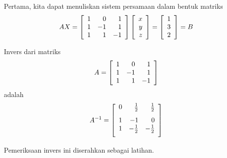 \begin{solution} Pertama, kita dapat menuliskan sistem persamaan dalam bentuk matriks
\begin{equation}
AX = 
\left[
\begin{array}{rrr}
1 & 0 & 1 \\
1 & -1 & 1 \\
1 & 1 & -1
\end{array}
\right] \left[
\begin{array}{r}
x \\
y \\
z
\end{array}
\right] =\left[
\begin{array}{r}
1 \\
3 \\
2
\end{array}
\right]  = B  \label{inversesystem1}
\end{equation}

Invers dari matriks
\begin{equation*}
A = \left[
\begin{array}{rrr}
1 & 0 & 1 \\
1 & -1 & 1 \\
1 & 1 & -1
\end{array}
\right]
\end{equation*}
adalah
\begin{equation*}
A^{-1} = \leftB
\begin{array}{rrr}
0 & \vspace{0.05in}\frac{1}{2} & \vspace{0.05in}\frac{1}{2} \\
1 & -1 & 0 \\
1 & -\vspace{0.05in}\frac{1}{2} & -\vspace{0.05in}\frac{1}{2}
\end{array}
\rightB
\end{equation*}

Pemeriksaan invers ini diserahkan sebagai latihan.


\end{solution}
